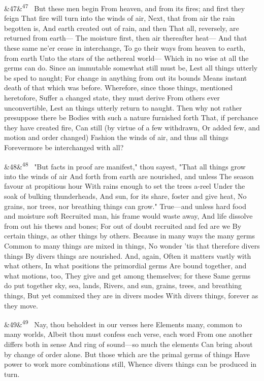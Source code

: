 \documentclass[12pt]{article}
\newcommand{\para}[1][]{\par\noindent\ifx&#1&\else\textsuperscript{\footnotesize #1}~\fi}
\begin{document}
\para[47] But these men begin From heaven, and from its fires; and first they feign That fire will turn into the winds of air, Next, that from air the rain begotten is, And earth created out of rain, and then That all, reversely, are returned from earth--- The moisture first, then air thereafter heat--- And that these same ne'er cease in interchange, To go their ways from heaven to earth, from earth Unto the stars of the aethereal world--- Which in no wise at all the germs can do. Since an immutable somewhat still must be, Lest all things utterly be sped to naught; For change in anything from out its bounds Means instant death of that which was before. Wherefore, since those things, mentioned heretofore, Suffer a changed state, they must derive From others ever unconvertible, Lest an things utterly return to naught. Then why not rather presuppose there be Bodies with such a nature furnished forth That, if perchance they have created fire, Can still (by virtue of a few withdrawn, Or added few, and motion and order changed) Fashion the winds of air, and thus all things Forevermore be interchanged with all?

\para[48] "But facts in proof are manifest," thou sayest, "That all things grow into the winds of air And forth from earth are nourished, and unless The season favour at propitious hour With rains enough to set the trees a-reel Under the soak of bulking thunderheads, And sun, for its share, foster and give heat, No grains, nor trees, nor breathing things can grow." True---and unless hard food and moisture soft Recruited man, his frame would waste away, And life dissolve from out his thews and bones; For out of doubt recruited and fed are we By certain things, as other things by others. Because in many ways the many germs Common to many things are mixed in things, No wonder 'tis that therefore divers things By divers things are nourished. And, again, Often it matters vastly with what others, In what positions the primordial germs Are bound together, and what motions, too, They give and get among themselves; for these Same germs do put together sky, sea, lands, Rivers, and sun, grains, trees, and breathing things, But yet commixed they are in divers modes With divers things, forever as they move.

\para[49] Nay, thou beholdest in our verses here Elements many, common to many worlds, Albeit thou must confess each verse, each word From one another differs both in sense And ring of sound---so much the elements Can bring about by change of order alone. But those which are the primal germs of things Have power to work more combinations still, Whence divers things can be produced in turn.
\end{document}

